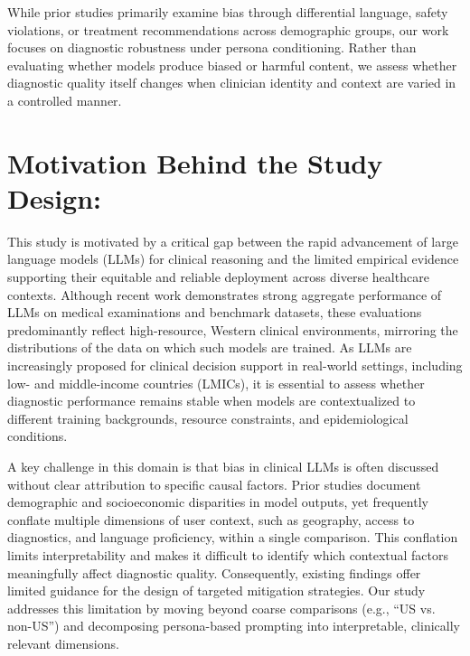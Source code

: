 \documentclass[sigconf]{acmart}
\begin{document}
While prior studies primarily examine bias through differential language, safety violations, or treatment recommendations across demographic groups, our work focuses on diagnostic robustness under persona conditioning. Rather than evaluating whether models produce biased or harmful content, we assess whether diagnostic quality itself changes when clinician identity and context are varied in a controlled manner.
\raggedbottom
\section{Motivation Behind the Study Design:}
This study is motivated by a critical gap between the rapid advancement of large language models (LLMs) for clinical reasoning and the limited empirical evidence supporting their equitable and reliable deployment across diverse healthcare contexts. Although recent work demonstrates strong aggregate performance of LLMs on medical examinations and benchmark datasets, these evaluations predominantly reflect high-resource, Western clinical environments, mirroring the distributions of the data on which such models are trained. As LLMs are increasingly proposed for clinical decision support in real-world settings, including low- and middle-income countries (LMICs), it is essential to assess whether diagnostic performance remains stable when models are contextualized to different training backgrounds, resource constraints, and epidemiological conditions.

A key challenge in this domain is that bias in clinical LLMs is often discussed without clear attribution to specific causal factors. Prior studies document demographic and socioeconomic disparities in model outputs, yet frequently conflate multiple dimensions of user context, such as geography, access to diagnostics, and language proficiency, within a single comparison. This conflation limits interpretability and makes it difficult to identify which contextual factors meaningfully affect diagnostic quality. Consequently, existing findings offer limited guidance for the design of targeted mitigation strategies. Our study addresses this limitation by moving beyond coarse comparisons (e.g., “US vs. non-US”) and decomposing persona-based prompting into interpretable, clinically relevant dimensions.
\end{document}
